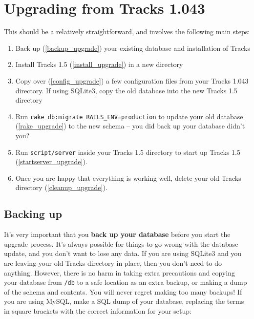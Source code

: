 \documentclass[10pt,twoside]{memoir}
\begin{document}
\section{Upgrading from Tracks 1.043}
\label{upgrading_1043}

This should be a relatively straightforward, and involves the following main steps:


\begin{enumerate}


\item Back up (\autoref{backup_upgrade}) your existing database and installation of Tracks

\item Install Tracks 1.5 (\autoref{install_upgrade}) in a new directory

\item Copy over (\autoref{config_upgrade}) a few configuration files from your Tracks 1.043 directory. If using SQLite3, copy the old database into the new Tracks 1.5 directory

\item Run \texttt{rake db:migrate RAILS\_ENV=production} to update your old database (\autoref{rake_upgrade}) to the new schema -- you did back up your database didn't you?

\item Run \texttt{script/server} inside your Tracks 1.5 directory to start up Tracks 1.5 (\autoref{startserver_upgrade}).

\item Once you are happy that everything is working well, delete your old Tracks directory (\autoref{cleanup_upgrade}).
\end{enumerate}

\subsection{Backing up}
\label{backup_upgrade}

It's very important that you \textbf{back up your database} before you start the upgrade process. It's always possible for things to go wrong with the database update, and you don't want to lose any data. If you are using SQLite3 and you are leaving your old Tracks directory in place, then you don't need to do anything. However, there is no harm in taking extra precautions and copying your database from \texttt{/db} to a safe location as an extra backup, or making a dump of the schema and contents. You will never regret making too many backups! If you are using MySQL, make a SQL dump of your database, replacing the terms in square brackets with the correct information for your setup:
\end{document}
